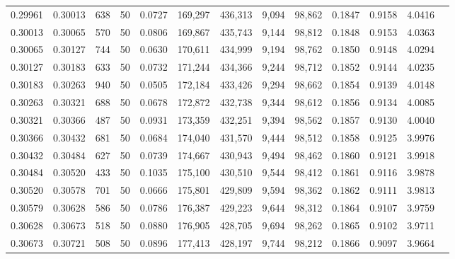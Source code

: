 \begin{tabular}{rrrrrrrrrrrrr}
0.29961 & 0.30013 &   638 &  50 &                                     0.0727 & 169,297 & 436,313 &   9,094 &  98,862 & 0.1847 & 0.9158 & 4.0416 \\
0.30013 & 0.30065 &   570 &  50 &                                     0.0806 & 169,867 & 435,743 &   9,144 &  98,812 & 0.1848 & 0.9153 & 4.0363 \\
0.30065 & 0.30127 &   744 &  50 &                                     0.0630 & 170,611 & 434,999 &   9,194 &  98,762 & 0.1850 & 0.9148 & 4.0294 \\
0.30127 & 0.30183 &   633 &  50 &                                     0.0732 & 171,244 & 434,366 &   9,244 &  98,712 & 0.1852 & 0.9144 & 4.0235 \\
0.30183 & 0.30263 &   940 &  50 &                                     0.0505 & 172,184 & 433,426 &   9,294 &  98,662 & 0.1854 & 0.9139 & 4.0148 \\
0.30263 & 0.30321 &   688 &  50 &                                     0.0678 & 172,872 & 432,738 &   9,344 &  98,612 & 0.1856 & 0.9134 & 4.0085 \\
0.30321 & 0.30366 &   487 &  50 &                                     0.0931 & 173,359 & 432,251 &   9,394 &  98,562 & 0.1857 & 0.9130 & 4.0040 \\
0.30366 & 0.30432 &   681 &  50 &                                     0.0684 & 174,040 & 431,570 &   9,444 &  98,512 & 0.1858 & 0.9125 & 3.9976 \\
0.30432 & 0.30484 &   627 &  50 &                                     0.0739 & 174,667 & 430,943 &   9,494 &  98,462 & 0.1860 & 0.9121 & 3.9918 \\
0.30484 & 0.30520 &   433 &  50 &                                     0.1035 & 175,100 & 430,510 &   9,544 &  98,412 & 0.1861 & 0.9116 & 3.9878 \\
0.30520 & 0.30578 &   701 &  50 &                                     0.0666 & 175,801 & 429,809 &   9,594 &  98,362 & 0.1862 & 0.9111 & 3.9813 \\
0.30579 & 0.30628 &   586 &  50 &                                     0.0786 & 176,387 & 429,223 &   9,644 &  98,312 & 0.1864 & 0.9107 & 3.9759 \\
0.30628 & 0.30673 &   518 &  50 &                                     0.0880 & 176,905 & 428,705 &   9,694 &  98,262 & 0.1865 & 0.9102 & 3.9711 \\
0.30673 & 0.30721 &   508 &  50 &                                     0.0896 & 177,413 & 428,197 &   9,744 &  98,212 & 0.1866 & 0.9097 & 3.9664 \\

\end{tabular}

